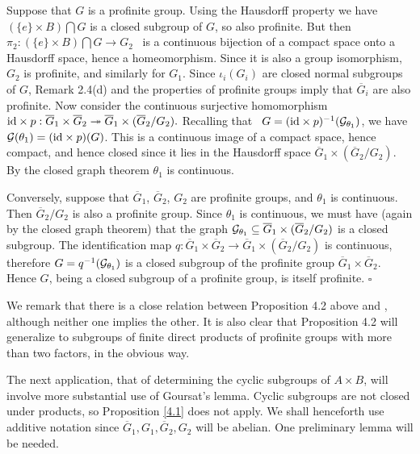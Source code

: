 \documentclass[11pt]{article}
\theoremstyle{change}
\newcommand{\<}{\langle}
\renewcommand{\>}{\rangle}
\newcommand{\Proof} {\noindent{\itshape Proof.\quad }}
\newcommand{\qed}{\quad\hfill$\square$}
\begin{document}
\Proof  Suppose that $G$ is a profinite group. Using the Hausdorff property we have
$(\{ e\}\times B)\bigcap G$ is a closed subgroup of $G$, so also profinite. But then \ $\pi_2 : 
  (\{ e\}\times B)\bigcap G  \to G_2  $ \ is a continuous bijection of a compact space onto
   a Hausdorff space,
hence a homeomorphism. Since it is also a group isomorphism, $G_2$ is profinite, and similarly for $G_1.$
 Since $\iota_i(G_i)$ are closed normal subgroups of $G$, Remark 2.4(d)
 and the properties
of profinite groups imply that $\overline{G}_i$ are also profinite. Now consider the
continuous surjective homomorphism \ 
${\rm id}\times p : \overline{G}_1\times \overline{G}_2 \twoheadrightarrow 
\overline{G}_1\times (\overline{G}_2/G_2).$ Recalling that \ $G = 
({\rm id}\times p)^{-1}({\cal G}_{\theta_1})$, we have  ${\cal G}
(\theta_1)= ({\rm id}\times p) (G)$. This is a continuous image of a compact
space, hence compact, and hence closed since it lies in the Hausdorff space
$\overline{G}_1\times (\overline{G}_2/G_2).$ By the closed graph theorem
$\theta_1$ is continuous.
 

Conversely, suppose that $\overline{G}_1$, $\overline{G}_2$, $G_2$ are profinite groups, and $\theta_1$ is continuous.  Then $\overline{G}_2/G_2$ is also a profinite group.  Since $\theta_1$ is continuous, we must have (again by the 
closed graph theorem) that the graph ${\cal G}_{\theta_1} \subseteq
\overline{G}_1\times (\overline{G}_2/G_2)$
 is a closed subgroup.  The identification
 map $q:
  \overline{G}_1\times \overline{G}_2\to \overline{G}_1\times (\overline{G}_2/G_2)$ is continuous,  therefore $G=q^{-1}({\cal G}_{\theta_1})$
   is a closed subgroup of the profinite group $\overline{G}_1\times \overline{G}_2$.  Hence $G$, being a closed subgroup of a profinite group, is itself profinite. 
\qed

We remark that there is a close relation between Proposition 4.2 above and 
 \cite[Lemma 4.6]{Greicius}, although neither one implies the other. It is also clear that
 Proposition 4.2 will generalize to subgroups of finite direct products of profinite groups with more than two factors,
 in the obvious way.



 The next application, that of determining the cyclic subgroups of $A\times B$, will involve more substantial use of Goursat's lemma.  Cyclic subgroups are not closed under products, so Proposition \ref{4.1} does not apply.   We shall henceforth use additive notation since $\overline{G}_1,G_1,\overline{G}_2,G_2$ will be abelian.  One preliminary lemma will be needed.
 
\end{document}
